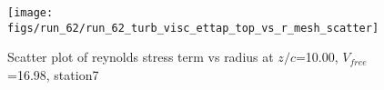\begin{figure}[H]
\centering
\texttt{[image: figs/run\_62/run\_62\_turb\_visc\_ettap\_top\_vs\_r\_mesh\_scatter]}
\caption{Scatter plot of reynolds stress term vs radius at $z/c$=10.00, $V_{free}$=16.98, station7}
\label{fig:run_62_turb_visc_ettap_top_vs_r_mesh_scatter}
\end{figure}


